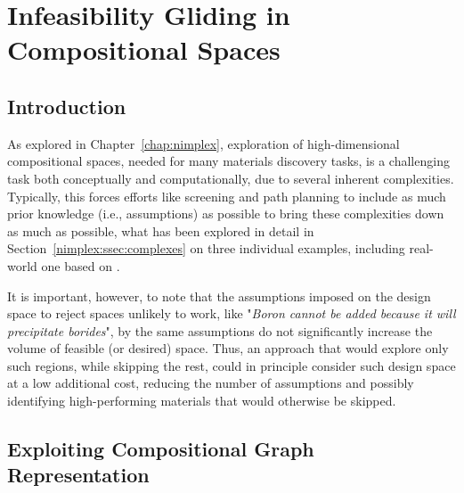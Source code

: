 \chapter{Infeasibility Gliding in Compositional Spaces} \label{chap:infeasibilitygliding}


\section{Introduction} \label{infglide:sec:intro}

As explored in Chapter~\ref{chap:nimplex}, exploration of high-dimensional compositional spaces, needed for many materials discovery tasks, is a challenging task both conceptually and computationally, due to several inherent complexities. Typically, this forces efforts like screening and path planning to include as much prior knowledge (i.e., assumptions) as possible to bring these complexities down as much as possible, what has been explored in detail in Section~\ref{nimplex:ssec:complexes} on three individual examples, including real-world one based on \citet{Bobbio2022DesignCompositions}.

It is important, however, to note that the assumptions imposed on the design space to reject spaces unlikely to work, like "\textit{Boron cannot be added because it will precipitate borides}", by the same assumptions do not significantly increase the volume of feasible (or desired) space. Thus, an approach that would explore only such regions, while skipping the rest, could in principle consider such design space at a low additional cost, reducing the number of assumptions and possibly identifying high-performing materials that would otherwise be skipped.

\section{Exploiting Compositional Graph Representation} \label{infglide:sec:exploitgraph}


